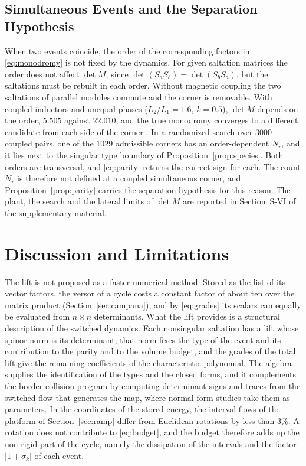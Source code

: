 \documentclass[journal]{IEEEtran}
\begin{document}
\subsection{Simultaneous Events and the Separation Hypothesis}
\label{sec:esquina}
When two events coincide, the order of the corresponding factors in
\eqref{eq:monodromy} is not fixed by the dynamics. For given saltation
matrices the order does not affect $\det M$, since
$\det(S_aS_b)=\det(S_bS_a)$, but the saltations must be rebuilt in each
order. Without magnetic coupling the two saltations of parallel modules
commute and the corner is removable. With coupled inductors and unequal
phases ($L_2/L_1=1.6$, $k=0.5$), $\det M$ depends on the order, $5.505$
against $22.010$, and the true monodromy converges to a different candidate
from each side of the corner \cite{dibernardo2001corner,burden2016}. In a
randomized search over $3000$ coupled pairs, one of the $1029$ admissible
corners has an order-dependent $N_r$, and it lies next to the singular type
boundary of Proposition~\ref{prop:species}. Both orders are transversal, and
\eqref{eq:parity} returns the correct sign for each. The count $N_r$ is
therefore not defined at a coupled simultaneous corner, and
Proposition~\ref{prop:parity} carries the separation hypothesis for this
reason. The plant, the search and the lateral limits of $\det M$ are
reported in Section~S-VI of the supplementary material.

\section{Discussion and Limitations}
\label{sec:discussion}
The lift is not proposed as a faster numerical method. Stored as the list of
its vector factors, the versor of a cycle costs a constant factor of about
ten over the matrix product (Section~\ref{sec:campana}), and by
\eqref{eq:grades} its scalars can equally be evaluated from $n\times n$
determinants. What the lift provides is a structural description of the
switched dynamics. Each nonsingular saltation
has a lift whose spinor norm is its determinant; that norm fixes the type
of the event and its contribution to the parity and to the volume budget,
and the grades of the total lift give the remaining coefficients of the
characteristic polynomial. The algebra supplies the identification of the
types and the closed forms, and it complements the border-collision program
\cite{ghosh2025robust,simpson2025zero,fatoyinbo2023synopsis} by computing
determinant signs and traces from the switched flow that generates the map,
where normal-form studies take them as parameters. In the coordinates of the stored energy, the interval flows of the
platform of Section~\ref{sec:ramp} differ from Euclidean rotations by less
than $3\%$. A rotation does not contribute to
\eqref{eq:budget}, and the budget therefore adds up the non-rigid part of
the cycle, namely the dissipation of the intervals and the factor
$\lvert1+\sigma_k\rvert$ of each event.
\end{document}
